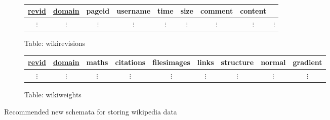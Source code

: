 \begin{figure}
  \centering
  \\
  \vspace{10 mm}
  \begin{subfigure}[b!]{\linewidth}
    \centering
    \begin{tabular}{ccccccccc}
      \toprule
      \underline{revid} & \underline{domain} & pageid & username & time & size &
      comment & content \\ 
      \midrule
      $\vdots$ & $\vdots$ & $\vdots$ & $\vdots$ & $\vdots$ & $\vdots$ & $\vdots$
      & $\vdots$ & $\vdots$ \\
    \end{tabular}
    \caption{Table: wikirevisions}
  \end{subfigure}

  \begin{subfigure}[b!]{\linewidth}
    \centering
    \begin{tabular}{ccccccccc}
      \toprule
      \underline{revid} & \underline{domain} & maths & citations & filesimages & links &
      structure & normal & gradient\\
      \midrule
      $\vdots$ & $\vdots$ & $\vdots$ & $\vdots$ & $\vdots$ & $\vdots$ &
      $\vdots$ & $\vdots$ & $\vdots$ \\
    \end{tabular}
    \caption{Table: wikiweights} 
  \end{subfigure}
  \caption{Recommended new schemata for storing wikipedia data}
  \label{fig:database-new}
\end{figure}

